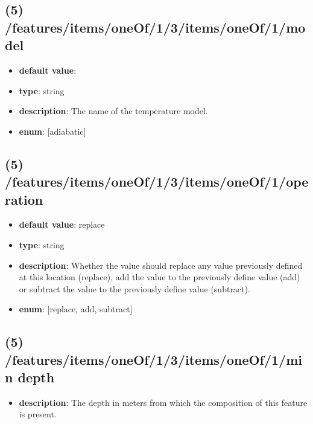 \subsection{(5) /features/items/oneOf/1/3/items/oneOf/1/model}
\begin{itemize}[leftmargin=5em]\item {\bf default value}: 
\item {\bf type}: string
\item {\bf description}: The name of the temperature model.
\item {\bf enum}: [adiabatic]\end{itemize}\subsection{(5) /features/items/oneOf/1/3/items/oneOf/1/operation}
\begin{itemize}[leftmargin=5em]\item {\bf default value}: replace
\item {\bf type}: string
\item {\bf description}: Whether the value should replace any value previously defined at this location (replace), add the value to the previously define value (add) or subtract the value to the previously define value (subtract).
\item {\bf enum}: [replace, add, subtract]\end{itemize}\subsection{(5) /features/items/oneOf/1/3/items/oneOf/1/min depth}
\begin{itemize}[leftmargin=5em]\item {\bf description}: The depth in meters from which the composition of this feature is present.
\end{itemize}
